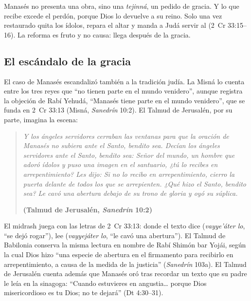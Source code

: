 Manasés no presenta una obra, sino una \emph{tejinná}, un pedido de gracia. Y lo que recibe excede el perdón, porque Dios lo devuelve a su reino. Solo una vez restaurado quita los ídolos, repara el altar y manda a Judá servir al \SENOR{} (2~Cr 33:15--16). La reforma es fruto y no causa: llega después de la gracia.


\subsection{El escándalo de la gracia}
El caso de Manasés escandalizó también a la tradición judía. La Misná lo cuenta entre los tres reyes que ``no tienen parte en el mundo venidero'', aunque registra la objeción de Rabí Yehudá, ``Manasés tiene parte en el mundo venidero'', que se funda en 2~Cr 33:13 (Misná, \emph{Sanedrín} 10:2). El Talmud de Jerusalén, por su parte, imagina la escena:

\begin{quote}\itshape
Y los ángeles servidores cerraban las ventanas para que la oración de Manasés no subiera ante el Santo, bendito sea. Decían los ángeles servidores ante el Santo, bendito sea: Señor del mundo, un hombre que adoró ídolos y puso una imagen en el santuario, ¿tú lo recibes en arrepentimiento? Les dijo: Si no lo recibo en arrepentimiento, cierro la puerta delante de todos los que se arrepienten. ¿Qué hizo el Santo, bendito sea? Le cavó una abertura debajo de su trono de gloria y oyó su súplica.\par\hfill{\upshape\small\bfseries\textcolor{azulp}{(Talmud de Jerusalén, \emph{Sanedrín} 10:2)}}
\end{quote}


El midrash juega con las letras de 2~Cr 33:13: donde el texto dice  (\emph{vayye'áter lo}, ``se dejó rogar''), lee  (\emph{vayyejáter lo}, ``le cavó una abertura''). El Talmud de Babilonia conserva la misma lectura en nombre de Rabí Shimón bar Yojái, según la cual Dios hizo ``una especie de abertura en el firmamento para recibirlo en arrepentimiento, a causa de la medida de la justicia'' (\emph{Sanedrín} 103a). El Talmud de Jerusalén cuenta además que Manasés oró tras recordar un texto que su padre le leía en la sinagoga: ``Cuando estuvieres en angustia\ldots{} porque Dios misericordioso es \SENOR{} tu Dios; no te dejará'' (Dt 4:30--31).

